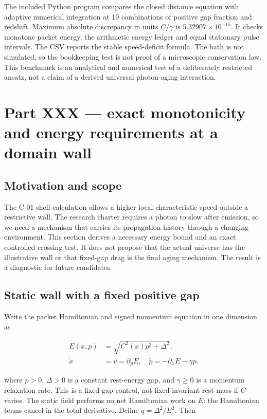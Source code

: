 \documentclass[
  11pt,
  twoside]{article}
\begin{document}
The included Python program compares the closed distance equation with
adaptive numerical integration at 19 combinations of positive gap
fraction and redshift. Maximum absolute discrepancy in units
\(C/\gamma\) is \(5.32907\times10^{-15}\). It checks monotone packet
energy, the arithmetic energy ledger and equal stationary pulse
intervals. The CSV reports the stable speed-deficit formula. The bath is
not simulated, so the bookkeeping test is not proof of a microscopic
conservation law. This benchmark is an analytical and numerical test of
a deliberately restricted ansatz, not a claim of a derived universal
photon-aging interaction.

\section{Part XXX --- exact monotonicity and energy requirements at a
domain
wall}\label{part-xxx-exact-monotonicity-and-energy-requirements-at-a-domain-wall}

\subsection{Motivation and scope}\label{motivation-and-scope}

The C-01 shell calculation allows a higher local characteristic speed
outside a restrictive wall. The research charter requires a photon to
slow after emission, so we need a mechanism that carries its propagation
history through a changing environment. This section derives a necessary
energy bound and an exact controlled crossing test. It does not propose
that the actual universe has the illustrative wall or that fixed-gap
drag is the final aging mechanism. The result is a diagnostic for future
candidates.

\subsection{Static wall with a fixed positive
gap}\label{static-wall-with-a-fixed-positive-gap}

Write the packet Hamiltonian and signed momentum equation in one
dimension as

\[\begin{aligned}E(x,p)&=\sqrt{C^2(x)p^2+\Delta^2},\\\dot x&=v=\partial_pE,\quad \dot p=-\partial_x E-\gamma p.\end{aligned}\]

where \(p>0\), \(\Delta>0\) is a constant rest-energy gap, and
\(\gamma\geq0\) is a momentum relaxation rate. This is a fixed-gap
control, not fixed invariant rest mass if \(C\) varies. The static field
performs no net Hamiltonian work on \(E\): the Hamiltonian terms cancel
in the total derivative. Define \(q=\Delta^2/E^2\). Then
\end{document}
